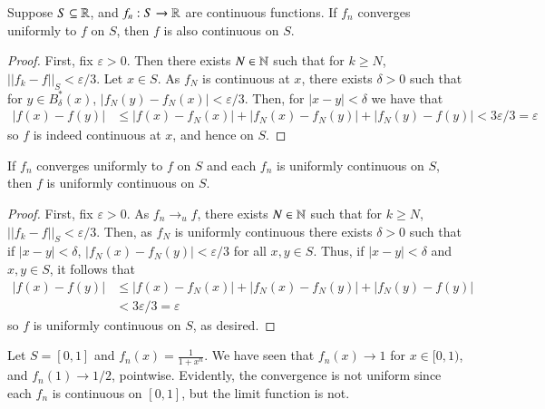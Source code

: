 \begin{thm}
    Suppose $S \subseteq \mathbb R$, and $f_n:S\rightarrow \mathbb R$ are continuous functions. If $f_n$ converges uniformly to $f$ on $S$, then $f$ is also continuous on $S$.
\end{thm}
\begin{proof}
    First, fix $\varepsilon > 0$. Then there exists $N \in \mathbb N$ such that for $k \geq N$, $||f_k - f||_S < \varepsilon/3$. Let $x \in S$. As $f_N$ is continuous at $x$, there exists $\delta > 0$ such that for $y \in B_{\delta}^*(x)$, $|f_N(y) -f_N(x)| < \varepsilon/3$. Then, for $|x-y| < \delta$ we have that \begin{align*}
        |f(x) - f(y)| &\leq |f(x) - f_N(x)| + |f_N(x) - f_N(y)| + |f_N(y) - f(y)| < 3\varepsilon/3 = \varepsilon
    \end{align*}
    so $f$ is indeed continuous at $x$, and hence on $S$.
\end{proof}


\begin{prop}
    If $f_n$ converges uniformly to $f$ on $S$ and each $f_n$ is uniformly continuous on $S$, then $f$ is uniformly continuous on $S$.
\end{prop}
\begin{proof}
    First, fix $\varepsilon > 0$. As $f_n\rightarrow_uf$, there exists $N \in \mathbb N$ such that for $k \geq N$, $||f_k - f||_S < \varepsilon/3$. Then, as $f_N$ is uniformly continuous there exists $\delta > 0$ such that if $|x-y| < \delta$, $|f_N(x) - f_N(y)| < \varepsilon/3$ for all $x,y \in S$. Thus, if $|x-y| < \delta$ and $x,y \in S$, it follows that \begin{align*}
        |f(x) - f(y)| &\leq |f(x) - f_N(x)| + |f_N(x) - f_N(y)| + |f_N(y) - f(y)| \\
        &< 3\varepsilon/3 = \varepsilon
    \end{align*}
    so $f$ is uniformly continuous on $S$, as desired.
\end{proof}

\begin{eg}
    Let $S = [0,1]$ and $f_n(x) = \frac{1}{1+x^n}$. We have seen that $f_n(x) \rightarrow 1$ for $x \in [0,1)$, and $f_n(1)\rightarrow 1/2$, pointwise. Evidently, the convergence is not uniform since each $f_n$ is continuous on $[0,1]$, but the limit function is not.
\end{eg}

